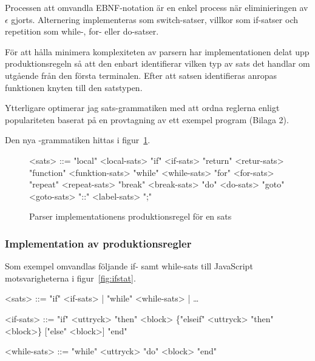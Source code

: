 Processen att omvandla EBNF-notation är en enkel process när eliminieringen av
$\epsilon$ gjorts. Alternering implementeras som switch-satser, villkor som
if-satser och repetition som while-, for- eller do-satser.

För att hålla minimera komplexiteten av parsern har implementationen delat upp
produktionsregeln  så att den enbart identifierar vilken typ av
sats det handlar om utgående från den första terminalen. Efter att satsen
identifieras anropas funktionen knyten till den satstypen.

Ytterligare optimerar jag sats-grammatiken med att ordna reglerna enligt
populariteten baserat på en provtagning av ett exempel program (Bilaga 2).

Den nya -grammatiken hittas i figur~\ref{fig:stat}.

\begin{figure}
  \setlength{\grammarindent}{5em}
  \begin{grammar}
    \singlespace\small%
    \selectfont
    <sats> ::= "local" <local-sats>
      \alt "if" <if-sats>
      \alt "return" <retur-sats>
      \alt "function" <funktion-sats>
      \alt "while" <while-sats>
      \alt "for" <for-sats>
      \alt "repeat" <repeat-sats>
      \alt "break" <break-sats>
      \alt "do" <do-sats>
      \alt "goto" <goto-sats>
      \alt "::" <label-sats>
      \alt ";"
  \end{grammar}
  \caption{Parser implementationens produktionsregel för en sats}
  \label{fig:stat}
\end{figure}

\subsubsection{Implementation av produktionsregler}

Som exempel omvandlas följande if- samt while-sats till JavaScript
motsvarigheterna i figur~\ref{fig:ifstat}.

\setlength{\grammarindent}{3em}
\begin{grammar}
  \singlespace\small%
  \selectfont
    <sats> ::= "if" <if-sats> | "while" <while-sats> | \ldots

    <if-sats> ::= "if" <uttryck> "then" <block> \{"elseif" <uttryck> "then" <block>\}
    ["else" <block>] "end"

    <while-sats> ::= "while" <uttryck> "do" <block> "end"
\end{grammar}

